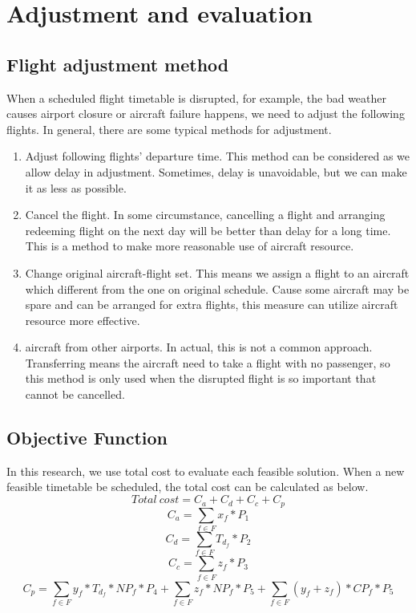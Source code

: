 \documentclass[senior]{IPSstyle}
\begin{document}
\section{Adjustment and evaluation}

\subsection{Flight adjustment method}
When a scheduled flight timetable is disrupted, for example, the bad weather causes airport closure or aircraft failure happens, we need to adjust the following flights. In general, there are some typical methods for adjustment.
\begin{enumerate}
    \item Adjust following flights’ departure time. This method can be considered as we allow delay in adjustment. Sometimes, delay is unavoidable, but we can make it as less as possible.
    \item Cancel the flight. In some circumstance, cancelling a flight and arranging redeeming flight on the next day will be better than delay for a long time. This is a method to make more reasonable use of aircraft resource.
    \item Change original aircraft-flight set. This means we assign a flight to an aircraft which different from the one on original schedule. Cause some aircraft may be spare and can be arranged for extra flights, this measure can utilize aircraft resource more effective.
    \item aircraft from other airports. In actual, this is not a common approach. Transferring means the aircraft need to take a flight with no passenger, so this method is only used when the disrupted flight is so important that cannot be cancelled. 
\end{enumerate}

\subsection{Objective Function}\label{section:Objective function}
In this research, we use total cost to evaluate each feasible solution. When a new feasible timetable be scheduled, the total cost can be calculated as below.
\begin{equation}\label{func:total cost}
    Total\ cost=C_a+C_d+C_c+C_p
\end{equation}
\begin{equation}\label{func:change aircraft cost}
    C_a = \sum_{f\in F} x_{f}*P_1
\end{equation}
\begin{equation}\label{func:delay cost}
    C_d =\sum_{f\in F} T_{d_f}*P_2
\end{equation}
\begin{equation}\label{func:cancel cost}
    C_c=\sum_{f\in F} z_{f}*P_3
\end{equation}
\begin{equation}\label{func:passsenger cost}
    C_p=\sum_{f\in F} y_f*T_{d_f}*NP_f*P_4+\sum_{f\in F} z_f*NP_f*P_5+\sum_{f\in F} (y_f+z_f)*CP_f*P_5
\end{equation}
\end{document}

